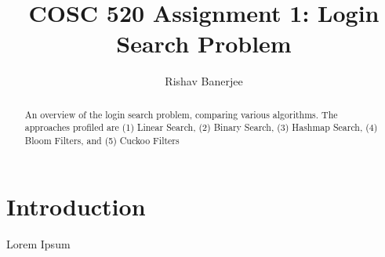 \documentclass[acmsmall,screen, nonacm]{acmart}
\begin{document}
\title{COSC 520 Assignment 1: Login Search Problem}

\author{Rishav Banerjee}

\renewcommand{\shortauthors}{Banerjee}

\begin{abstract}
	An overview of the login search problem, comparing various algorithms.
	The approaches profiled are (1) Linear Search, (2) Binary Search, (3) Hashmap Search, (4) Bloom Filters, and (5) Cuckoo Filters
\end{abstract}

\maketitle

\section{Introduction}

Lorem Ipsum~\cite{fan2014Cuckoo}



\end{document}
